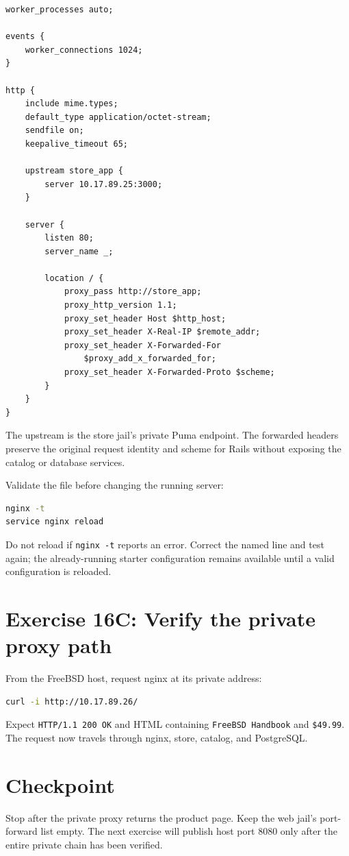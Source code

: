 \begin{lstlisting}
worker_processes auto;

events {
    worker_connections 1024;
}

http {
    include mime.types;
    default_type application/octet-stream;
    sendfile on;
    keepalive_timeout 65;

    upstream store_app {
        server 10.17.89.25:3000;
    }

    server {
        listen 80;
        server_name _;

        location / {
            proxy_pass http://store_app;
            proxy_http_version 1.1;
            proxy_set_header Host $http_host;
            proxy_set_header X-Real-IP $remote_addr;
            proxy_set_header X-Forwarded-For
                $proxy_add_x_forwarded_for;
            proxy_set_header X-Forwarded-Proto $scheme;
        }
    }
}
\end{lstlisting}

The upstream is the store jail's private Puma endpoint. The forwarded headers
preserve the original request identity and scheme for Rails without exposing
the catalog or database services.

Validate the file before changing the running server:

\begin{lstlisting}[language=sh]
nginx -t
service nginx reload
\end{lstlisting}

Do not reload if \texttt{nginx -t} reports an error. Correct the named line and
test again; the already-running starter configuration remains available until
a valid configuration is reloaded.

\section{Exercise 16C: Verify the private proxy path}

From the FreeBSD host, request nginx at its private address:

\begin{lstlisting}[language=sh]
curl -i http://10.17.89.26/
\end{lstlisting}

Expect \texttt{HTTP/1.1 200 OK} and HTML containing \texttt{FreeBSD Handbook}
and \texttt{\$49.99}. The request now travels through nginx, store, catalog,
and PostgreSQL.

\section{Checkpoint}

Stop after the private proxy returns the product page. Keep the web jail's
port-forward list empty. The next exercise will publish host port 8080 only
after the entire private chain has been verified.
